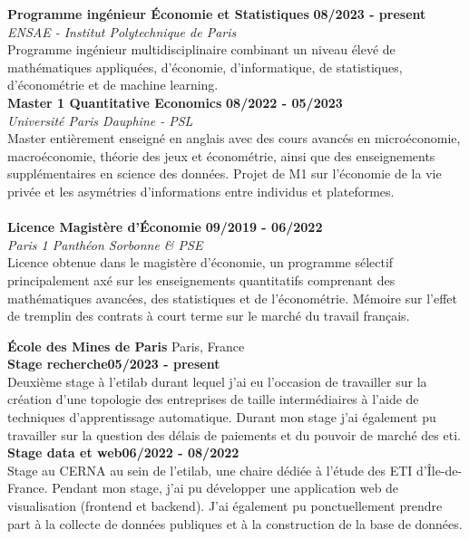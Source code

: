 \documentclass[11pt]{report}
\begin{document}
	
\noindent\textbf{Programme ingénieur \textbar\space Économie et Statistiques}
\hfill
\textbf{08/2023 - present} \\
\emph{ENSAE - Institut Polytechnique de Paris}\\
Programme ingénieur multidisciplinaire combinant un niveau élevé de mathématiques appliquées, d'économie, d'informatique, de statistiques, d'économétrie et de machine learning. \\

\noindent\textbf{Master 1 \textbar\space Quantitative Economics}
\hfill
\textbf{08/2022 - 05/2023} \\
\emph{Université Paris Dauphine - PSL}\\
Master entièrement enseigné en anglais avec des cours avancés en microéconomie, macroéconomie, théorie des jeux et économétrie, ainsi que des enseignements supplémentaires en science des données. Projet de M1 sur l'économie de la vie privée et les asymétries d'informations entre individus et plateformes.\\
\\
\noindent\textbf{Licence \textbar\space Magistère d'Économie}
\hfill
\textbf{09/2019 - 06/2022} \\
\emph{Paris 1 Panthéon Sorbonne \& PSE}\\
Licence obtenue dans le magistère d'économie, un programme sélectif principalement axé sur les enseignements quantitatifs comprenant des mathématiques avancées, des statistiques et de l'économétrie. Mémoire sur l'effet de tremplin des contrats à court terme sur le marché du travail français.

	\begin{flushleft}
	 \hrulefill
	\end{flushleft}


\noindent\textbf{École des Mines de Paris} \hfill Paris, France\\[0.1cm]
\textbf{Stage recherche}\hfill \textbf{05/2023 - present} \\
Deuxième stage à l'etilab durant lequel j'ai eu l'occasion de travailler sur la création d'une topologie des entreprises de taille intermédiaires à l'aide de techniques d'apprentissage automatique. Durant mon stage j'ai également pu travailler sur la question des délais de paiements et du pouvoir de marché des eti. \\[0.15cm]
\textbf{Stage data et web}\hfill \textbf{06/2022 - 08/2022} \\
Stage au CERNA au sein de l'etilab, une chaire dédiée à l'étude des ETI d'Île-de-France. Pendant mon stage, j'ai pu développer une application web de visualisation (frontend et backend).
J'ai également pu ponctuellement prendre part à la collecte de données publiques et à la construction de la base de données. \\
\end{document}
